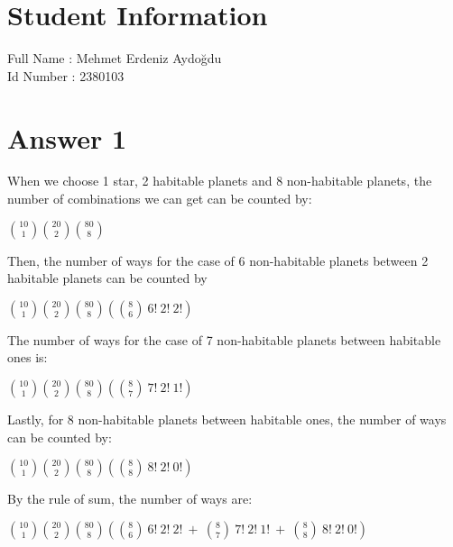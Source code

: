 \documentclass[11pt]{article}
\begin{document}
\section*{Student Information } 
Full Name :  Mehmet Erdeniz Aydoğdu \\ 
Id Number :  2380103 \\ 

\section*{Answer 1}
When we choose 1 star, 2 habitable planets and 8 non-habitable planets, the number of combinations we can get can be counted by: \newline \newline
\centerline{$\binom{10}{1} \binom{20}{2} \binom{80}{8}$} \newline \newline
Then, the number of ways for the case of 6 non-habitable planets between 2 habitable planets can be counted by \newline \newline
\centerline{$\binom{10}{1} \binom{20}{2} \binom{80}{8} (\binom{8}{6}\:6!\:2!\:2!)$} \newline \newline
The number of ways for the case of 7 non-habitable planets between habitable ones is: \newline \newline
\centerline{$\binom{10}{1} \binom{20}{2} \binom{80}{8} (\binom{8}{7}\:7!\:2!\:1!)$} \newline \newline
Lastly, for 8 non-habitable planets between habitable ones, the number of ways can be counted by: \newline \newline
\centerline{$\binom{10}{1} \binom{20}{2} \binom{80}{8} (\binom{8}{8}\:8!\:2!\:0!)$} \newline \newline
By the rule of sum, the number of ways are: \newline \newline
\centerline{$\binom{10}{1} \binom{20}{2} \binom{80}{8} (\binom{8}{6}\:6!\:2!\:2!\:+\:\binom{8}{7}\:7!\:2!\:1!\:+\:\binom{8}{8}\:8!\:2!\:0!)$}
\newpage
\end{document}
